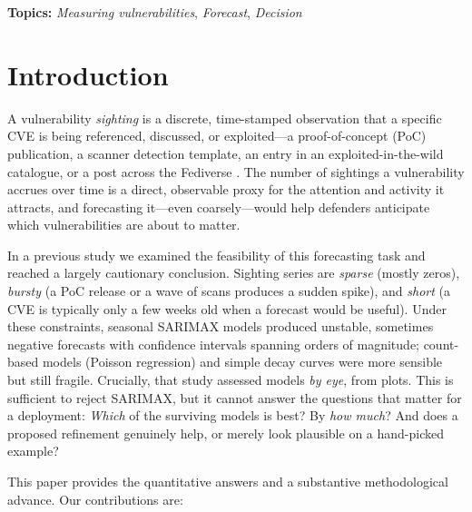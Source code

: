 \documentclass[]{article}
\begin{document}
\vspace{1em}
\noindent\textbf{Topics:} \textit{Measuring vulnerabilities}, \textit{Forecast}, \textit{Decision}

\section{Introduction}
A vulnerability \emph{sighting} is a discrete, time-stamped observation that a
specific CVE is being referenced, discussed, or exploited---a proof-of-concept
(PoC) publication, a scanner detection template, an entry in an exploited-in-the-wild
catalogue, or a post across the Fediverse \cite{bonhomme2025scoring}. The number
of sightings a vulnerability accrues over time is a direct, observable proxy for
the attention and activity it attracts, and forecasting it---even coarsely---would
help defenders anticipate which vulnerabilities are about to matter.

In a previous study \cite{bonhomme2026modeling} we examined the feasibility of
this forecasting task and reached a largely cautionary conclusion. Sighting series
are \emph{sparse} (mostly zeros), \emph{bursty} (a PoC release or a wave of scans
produces a sudden spike), and \emph{short} (a CVE is typically only a few weeks
old when a forecast would be useful). Under these constraints, seasonal SARIMAX
models produced unstable, sometimes negative forecasts with confidence intervals
spanning orders of magnitude; count-based models (Poisson regression) and simple
decay curves were more sensible but still fragile. Crucially, that study assessed
models \emph{by eye}, from plots. This is sufficient to reject SARIMAX, but it
cannot answer the questions that matter for a deployment: \emph{Which} of the
surviving models is best? By \emph{how much}? And does a proposed refinement
genuinely help, or merely look plausible on a hand-picked example?

This paper provides the quantitative answers and a substantive methodological
advance. Our contributions are:
\end{document}
